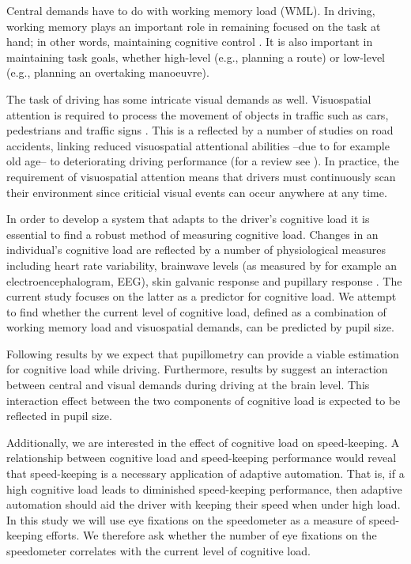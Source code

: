 Central demands have to do with working memory load (WML).
In driving, working memory plays an important role in remaining focused on the task at hand; in other words, maintaining cognitive control \citep{Wood2016}.
It is also important in maintaining task goals, whether high-level (e.g., planning a route) or low-level (e.g., planning an overtaking manoeuvre).

The task of driving has some intricate visual demands as well.
Visuospatial attention is required to process the movement of objects in traffic such as cars, pedestrians and traffic signs \citep{Zheng2020}.
This is a reflected by a number of studies on road accidents, linking reduced visuospatial attentional abilities --due to for example old age-- to deteriorating driving performance (for a review see \citealp{Owsley2010}).
In practice, the requirement of visuospatial attention means that drivers must continuously scan their environment since criticial visual events can occur anywhere at any time.

In order to develop a system that adapts to the driver's cognitive load it is essential to find a robust method of measuring cognitive load.
Changes in an individual's cognitive load are reflected by a number of physiological measures including heart rate variability, brainwave levels (as measured by for example an electroencephalogram, EEG), skin galvanic response and pupillary response \citep{Haapalainen2010}.
The current study focuses on the latter as a predictor for cognitive load. We attempt to find whether the current level of cognitive load, defined as a combination of working memory load and visuospatial demands, can be predicted by pupil size.

Following results by \citet{Palinko2010} we expect that pupillometry can provide a viable estimation for cognitive load while driving. 
Furthermore, results by \citet{Scheunemann2019} suggest an interaction between central and visual demands during driving at the brain level.
This interaction effect between the two components of cognitive load is expected to be reflected in pupil size.

Additionally, we are interested in the effect of cognitive load on speed-keeping.
A relationship between cognitive load and speed-keeping performance would reveal that speed-keeping is a necessary application of adaptive automation. 
That is, if a high cognitive load leads to diminished speed-keeping performance, then adaptive automation should aid the driver with keeping their speed when under high load.
In this study we will use eye fixations on the speedometer as a measure of speed-keeping efforts. We therefore ask whether the number of eye fixations on the speedometer correlates with the current level of cognitive load.


